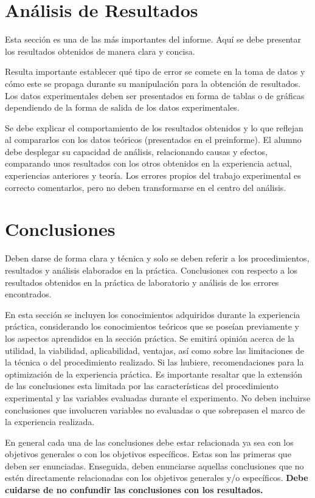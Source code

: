 \documentclass[a4paper]{article}
\begin{document}
\section{Análisis de Resultados}
Esta sección es una de las más importantes del informe. Aquí se debe presentar los resultados obtenidos de manera clara y concisa.

Resulta importante establecer qué tipo de error se comete en la toma de datos y cómo este se propaga durante su manipulación para la obtención de resultados. Los datos experimentales deben ser presentados en forma de tablas o de gráficas dependiendo de la forma de salida de los datos experimentales.

Se debe explicar el comportamiento de los resultados obtenidos y lo que reflejan al compararlos con los datos teóricos (presentados en el preinforme). El alumno debe desplegar su capacidad de análisis, relacionando causas y efectos, comparando unos resultados con los otros obtenidos en la experiencia actual, experiencias anteriores y teoría. Los errores propios del trabajo experimental es correcto comentarlos, pero no deben transformarse en el centro del análisis.

\section{Conclusiones}
Deben darse de forma clara y técnica y solo se deben referir a los procedimientos, resultados y análisis elaborados en la práctica. Conclusiones con respecto a los resultados obtenidos en la práctica de laboratorio y análisis de los errores encontrados. 

En esta sección se incluyen los conocimientos adquiridos durante la experiencia práctica, considerando los conocimientos teóricos que se poseían previamente y los aspectos aprendidos en la sección práctica. Se emitirá opinión acerca de la utilidad, la viabilidad, aplicabilidad, ventajas, así como sobre las limitaciones de la técnica o del procedimiento realizado. Si las hubiere, recomendaciones para la optimización de la experiencia práctica. Es importante resaltar que la extensión de las conclusiones esta limitada por las características del procedimiento experimental y las variables evaluadas durante el experimento. No deben incluirse conclusiones que involucren variables no evaluadas o que sobrepasen el marco de la experiencia realizada.

En general cada una de las conclusiones debe estar relacionada ya sea con los objetivos generales o con los objetivos específicos. Estas son las primeras que deben ser enunciadas. Enseguida, deben enunciarse aquellas conclusiones que no estén directamente relacionadas con los objetivos generales y/o específicos. \textbf{Debe cuidarse de no confundir las conclusiones con los resultados.}
\end{document}
